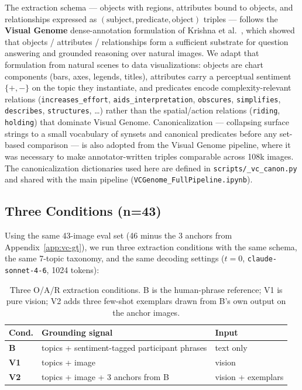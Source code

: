 The extraction schema --- objects with regions, attributes bound to
objects, and relationships expressed as
$(\text{subject}, \text{predicate}, \text{object})$ triples ---
follows the \textbf{Visual Genome} dense-annotation formulation of
Krishna et al.~\cite{krishna2017vg}, which showed that objects /
attributes / relationships form a sufficient substrate for question
answering and grounded reasoning over natural images. We adapt that
formulation from natural scenes to data visualizations: objects are
chart components (bars, axes, legends, titles), attributes carry a
perceptual sentiment $\{+, -\}$ on the topic they instantiate, and
predicates encode complexity-relevant relations
(\texttt{increases\_effort}, \texttt{aids\_interpretation},
\texttt{obscures}, \texttt{simplifies}, \texttt{describes},
\texttt{structures}, \dots) rather than the spatial/action relations
(\texttt{riding}, \texttt{holding}) that dominate Visual Genome.
Canonicalization --- collapsing surface strings to a small vocabulary
of synsets and canonical predicates before any set-based comparison
--- is also adopted from the Visual Genome pipeline, where it was
necessary to make annotator-written triples comparable across 108k
images. The canonicalization dictionaries used here are defined in
\texttt{scripts/\_vc\_canon.py} and shared with the main pipeline
(\texttt{VCGenome\_FullPipeline.ipynb}).

\subsection{Three Conditions (n=43)}
\label{app:oar-conditions}

Using the same 43-image eval set (46 minus the 3 anchors from
Appendix~\ref{app:vc-gt}), we run three extraction conditions with
the same schema, the same 7-topic taxonomy, and the same decoding
settings ($t=0$, \texttt{claude-sonnet-4-6}, 1024 tokens):

\begin{table}[h]
\centering
\caption{Three O/A/R extraction conditions. B is the human-phrase
reference; V1 is pure vision; V2 adds three few-shot exemplars drawn
from B's own output on the anchor images.}
\label{tab:oar-conditions}
\footnotesize
\begin{tabular*}{\linewidth}{@{\extracolsep{\fill}}lll@{}}
\toprule
Cond. & Grounding signal & Input \\
\midrule
\textbf{B}  & topics + sentiment-tagged participant phrases & text only \\
\textbf{V1} & topics + image                           & vision \\
\textbf{V2} & topics + image + 3 anchors from B        & vision + exemplars \\
\bottomrule
\end{tabular*}
\end{table}

